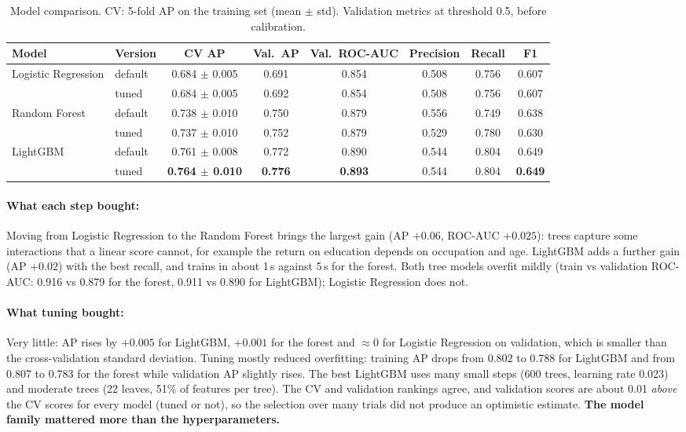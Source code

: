 \documentclass[11pt,a4paper]{article}
\begin{document}
\begin{table}[H]
\centering\small
\caption{Model comparison. CV: 5-fold AP on the training set (mean $\pm$ std). Validation metrics at threshold 0.5, before calibration.}
\label{tab:models}
\begin{tabular}{llcccccc}
\toprule
\rowcolor{headblue}
Model & Version & CV AP & Val.\ AP & Val.\ ROC-AUC & Precision & Recall & F1 \\
\midrule
\multirow{2}{*}{Logistic Regression} & default & 0.684 $\pm$ 0.005 & 0.691 & 0.854 & 0.508 & 0.756 & 0.607 \\
 & tuned & 0.684 $\pm$ 0.005 & 0.692 & 0.854 & 0.508 & 0.756 & 0.607 \\
\midrule
\multirow{2}{*}{Random Forest} & default & 0.738 $\pm$ 0.010 & 0.750 & 0.879 & 0.556 & 0.749 & 0.638 \\
 & tuned & 0.737 $\pm$ 0.010 & 0.752 & 0.879 & 0.529 & 0.780 & 0.630 \\
\midrule
\multirow{2}{*}{LightGBM} & default & 0.761 $\pm$ 0.008 & 0.772 & 0.890 & 0.544 & 0.804 & 0.649 \\
 & tuned & \textbf{0.764 $\pm$ 0.010} & \textbf{0.776} & \textbf{0.893} & 0.544 & 0.804 & \textbf{0.649} \\
\bottomrule
\end{tabular}
\end{table}

\paragraph{What each step bought:} Moving from Logistic Regression to the Random Forest brings the largest gain (AP $+0.06$, ROC-AUC $+0.025$): trees capture some interactions that a linear score cannot, for example the return on education depends on occupation and age. LightGBM adds a further gain (AP $+0.02$) with the best recall, and trains in about 1\,s against 5\,s for the forest. Both tree models overfit mildly (train vs validation ROC-AUC: 0.916 vs 0.879 for the forest, 0.911 vs 0.890 for LightGBM); Logistic Regression does not.

\paragraph{What tuning bought:} Very little: AP rises by $+0.005$ for LightGBM, $+0.001$ for the forest and $\approx0$ for Logistic Regression on validation, which is smaller than the cross-validation standard deviation. Tuning mostly reduced overfitting: training AP drops from 0.802 to 0.788 for LightGBM and from 0.807 to 0.783 for the forest while validation AP slightly rises. The best LightGBM uses many small steps (600 trees, learning rate 0.023) and moderate trees (22 leaves, 51\% of features per tree). The CV and validation rankings agree, and validation scores are about 0.01 \emph{above} the CV scores for every model (tuned or not), so the selection over many trials did not produce an optimistic estimate. \textbf{The model family mattered more than the hyperparameters.}
\end{document}
